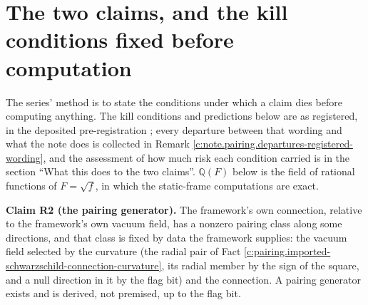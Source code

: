 \documentclass[11pt]{article}
\theoremstyle{definition}
\theoremstyle{plain}
\providecommand{\Q}{}\renewcommand{\Q}{\mathbb{Q}}
\begin{document}
\section{The two claims, and the kill conditions fixed before computation}

\label{c:note.pairing.setting-two-claims-kill-conditions-fixed}
The series' method is to state the conditions under which a claim dies before computing anything. The kill conditions and predictions below are as registered, in the deposited pre-registration \cite{ButlerPreregT05pairing}; every departure between that wording and what the note does is collected in Remark \ref{c:note.pairing.departures-registered-wording}, and the assessment of how much risk each condition carried is in the section ``What this does to the two claims''. $\Q(F)$ below is the field of rational functions of $F = \sqrt f$, in which the static-frame computations are exact.

\label{c:note.pairing.setting-two-claims-kill-conditions-fixed-2}
\textbf{Claim R2 (the pairing generator).} The framework's own connection, relative to the framework's own vacuum field, has a nonzero pairing class along some directions, and that class is fixed by data the framework supplies: the vacuum field selected by the curvature (the radial pair of Fact \ref{c:pairing.imported-schwarzschild-connection-curvature}, its radial member by the sign of the square, and a null direction in it by the flag bit) and the connection. A pairing generator exists and is derived, not premised, up to the flag bit.
\end{document}
